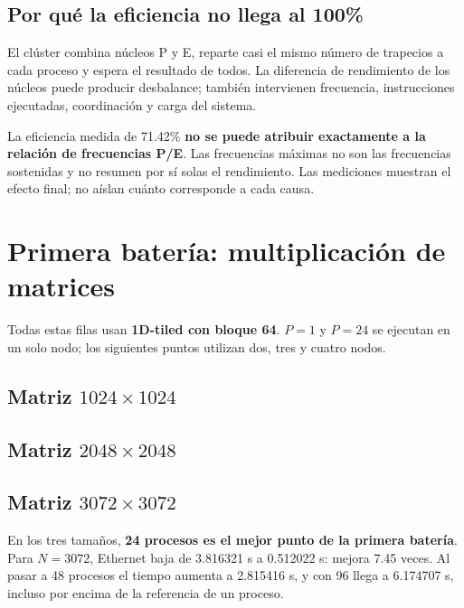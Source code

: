 
\subsection{Por qué la eficiencia no llega al 100\%}
El clúster combina núcleos P y E, reparte casi el mismo número de trapecios a cada proceso y espera el resultado de todos. La diferencia de rendimiento de los núcleos puede producir desbalance; también intervienen frecuencia, instrucciones ejecutadas, coordinación y carga del sistema.

La eficiencia medida de 71.42\% \textbf{no se puede atribuir exactamente a la relación de frecuencias P/E}. Las frecuencias máximas no son las frecuencias sostenidas y no resumen por sí solas el rendimiento. Las mediciones muestran el efecto final; no aíslan cuánto corresponde a cada causa.

\clearpage
\section{Primera batería: multiplicación de matrices}

Todas estas filas usan \textbf{1D-tiled con bloque 64}. $P=1$ y $P=24$ se ejecutan en un solo nodo; los siguientes puntos utilizan dos, tres y cuatro nodos.

\subsection{Matriz \texorpdfstring{$1024\times1024$}{1024 x 1024}}


\subsection{Matriz \texorpdfstring{$2048\times2048$}{2048 x 2048}}


\subsection{Matriz \texorpdfstring{$3072\times3072$}{3072 x 3072}}


En los tres tamaños, \textbf{24 procesos es el mejor punto de la primera batería}. Para $N=3072$, Ethernet baja de 3.816321 s a 0.512022 s: mejora 7.45 veces. Al pasar a 48 procesos el tiempo aumenta a 2.815416 s, y con 96 llega a 6.174707 s, incluso por encima de la referencia de un proceso.

